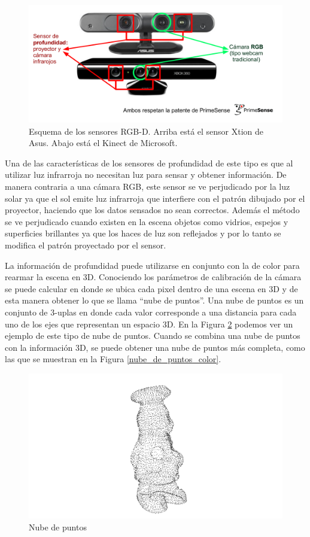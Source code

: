 \begin{figure}
	\centering
	\includegraphics[width=\textwidth]{img/sensores/sensores_rgbd.png}
	\caption{Esquema de los sensores RGB-D. Arriba está el sensor Xtion de Asus. Abajo está el Kinect de Microsoft.}
    \label{fig:sensores_rgbd}
\end{figure}

Una de las características de los sensores de profundidad de este tipo es que al utilizar luz infrarroja no necesitan luz para sensar y obtener información. De manera contraria a una cámara RGB, este sensor se ve perjudicado por la luz solar ya que el sol emite luz infrarroja que interfiere con el patrón dibujado por el proyector, haciendo que los datos sensados no sean correctos. Además el método se ve perjudicado cuando existen en la escena objetos como vidrios, espejos y superficies brillantes ya que los haces de luz son reflejados y por lo tanto se modifica el patrón proyectado por el sensor.

La información de profundidad puede utilizarse en conjunto con la de color para rearmar la escena en 3D. Conociendo los parámetros de calibración de la cámara se puede calcular en donde se ubica cada pixel dentro de una escena en 3D y de esta manera obtener lo que se llama ``nube de puntos''. Una nube de puntos es un conjunto de 3-uplas en donde cada valor corresponde a una distancia para cada uno de los ejes que representan un espacio 3D. En la Figura \ref{nube_de_puntos_sola} podemos ver un ejemplo de este tipo de nube de puntos. Cuando se combina una nube de puntos con la información 3D, se puede obtener una nube de puntos más completa, como las que se muestran en la Figura \ref{nube_de_puntos_color}.

\begin{figure}
	\centering
	\includegraphics[width=\textwidth]{img/nube_de_puntos_sola.png}
	\caption{Nube de puntos}
    \label{nube_de_puntos_sola}
\end{figure}


